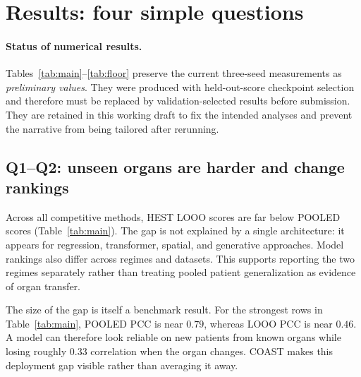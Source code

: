 \section{Results: four simple questions}
\label{sec:results}
\paragraph{Status of numerical results.}
Tables~\ref{tab:main}--\ref{tab:floor} preserve the current three-seed measurements as
\emph{preliminary values}. They were produced with held-out-score checkpoint selection and therefore
must be replaced by validation-selected results before submission. They are retained in this working
draft to fix the intended analyses and prevent the narrative from being tailored after rerunning.

\subsection{Q1--Q2: unseen organs are harder and change rankings}
Across all competitive methods, HEST LOOO scores are far below POOLED scores (Table~\ref{tab:main}).
The gap is not explained by a single architecture: it appears for regression, transformer, spatial,
and generative approaches. Model rankings also differ across regimes and datasets. This supports
reporting the two regimes separately rather than treating
pooled patient generalization as evidence of organ transfer.

The size of the gap is itself a benchmark result. For the strongest rows in Table~\ref{tab:main},
POOLED PCC is near $0.79$, whereas LOOO PCC is near $0.46$. A model can therefore look reliable on
new patients from known organs while losing roughly $0.33$ correlation when the organ changes. COAST
makes this deployment gap visible rather than averaging it away.


